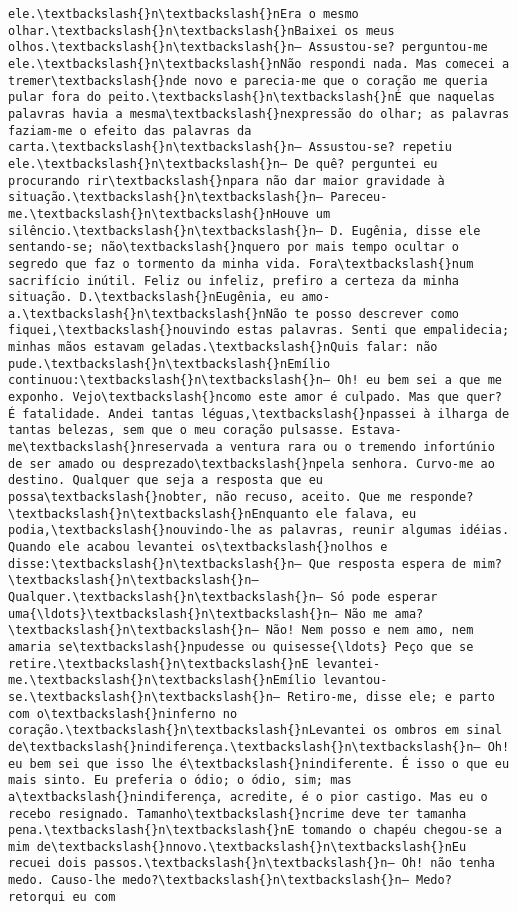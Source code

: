 \documentclass[11pt]{article}
\begin{document}
\begin{Verbatim}[commandchars=\\\{\}]
ele.\textbackslash{}n\textbackslash{}nEra o mesmo olhar.\textbackslash{}n\textbackslash{}nBaixei os meus olhos.\textbackslash{}n\textbackslash{}n— Assustou-se? perguntou-me ele.\textbackslash{}n\textbackslash{}nNão respondi nada. Mas comecei a tremer\textbackslash{}nde novo e parecia-me que o coração me queria pular fora do peito.\textbackslash{}n\textbackslash{}nÉ que naquelas palavras havia a mesma\textbackslash{}nexpressão do olhar; as palavras faziam-me o efeito das palavras da carta.\textbackslash{}n\textbackslash{}n— Assustou-se? repetiu ele.\textbackslash{}n\textbackslash{}n— De quê? perguntei eu procurando rir\textbackslash{}npara não dar maior gravidade à situação.\textbackslash{}n\textbackslash{}n— Pareceu-me.\textbackslash{}n\textbackslash{}nHouve um silêncio.\textbackslash{}n\textbackslash{}n— D. Eugênia, disse ele sentando-se; não\textbackslash{}nquero por mais tempo ocultar o segredo que faz o tormento da minha vida. Fora\textbackslash{}num sacrifício inútil. Feliz ou infeliz, prefiro a certeza da minha situação. D.\textbackslash{}nEugênia, eu amo-a.\textbackslash{}n\textbackslash{}nNão te posso descrever como fiquei,\textbackslash{}nouvindo estas palavras. Senti que empalidecia; minhas mãos estavam geladas.\textbackslash{}nQuis falar: não pude.\textbackslash{}n\textbackslash{}nEmílio continuou:\textbackslash{}n\textbackslash{}n— Oh! eu bem sei a que me exponho. Vejo\textbackslash{}ncomo este amor é culpado. Mas que quer? É fatalidade. Andei tantas léguas,\textbackslash{}npassei à ilharga de tantas belezas, sem que o meu coração pulsasse. Estava-me\textbackslash{}nreservada a ventura rara ou o tremendo infortúnio de ser amado ou desprezado\textbackslash{}npela senhora. Curvo-me ao destino. Qualquer que seja a resposta que eu possa\textbackslash{}nobter, não recuso, aceito. Que me responde?\textbackslash{}n\textbackslash{}nEnquanto ele falava, eu podia,\textbackslash{}nouvindo-lhe as palavras, reunir algumas idéias. Quando ele acabou levantei os\textbackslash{}nolhos e disse:\textbackslash{}n\textbackslash{}n— Que resposta espera de mim?\textbackslash{}n\textbackslash{}n— Qualquer.\textbackslash{}n\textbackslash{}n— Só pode esperar uma{\ldots}\textbackslash{}n\textbackslash{}n— Não me ama?\textbackslash{}n\textbackslash{}n— Não! Nem posso e nem amo, nem amaria se\textbackslash{}npudesse ou quisesse{\ldots} Peço que se retire.\textbackslash{}n\textbackslash{}nE levantei-me.\textbackslash{}n\textbackslash{}nEmílio levantou-se.\textbackslash{}n\textbackslash{}n— Retiro-me, disse ele; e parto com o\textbackslash{}ninferno no coração.\textbackslash{}n\textbackslash{}nLevantei os ombros em sinal de\textbackslash{}nindiferença.\textbackslash{}n\textbackslash{}n— Oh! eu bem sei que isso lhe é\textbackslash{}nindiferente. É isso o que eu mais sinto. Eu preferia o ódio; o ódio, sim; mas a\textbackslash{}nindiferença, acredite, é o pior castigo. Mas eu o recebo resignado. Tamanho\textbackslash{}ncrime deve ter tamanha pena.\textbackslash{}n\textbackslash{}nE tomando o chapéu chegou-se a mim de\textbackslash{}nnovo.\textbackslash{}n\textbackslash{}nEu recuei dois passos.\textbackslash{}n\textbackslash{}n— Oh! não tenha medo. Causo-lhe medo?\textbackslash{}n\textbackslash{}n— Medo? retorqui eu com 
\end{Verbatim}
\end{document}

